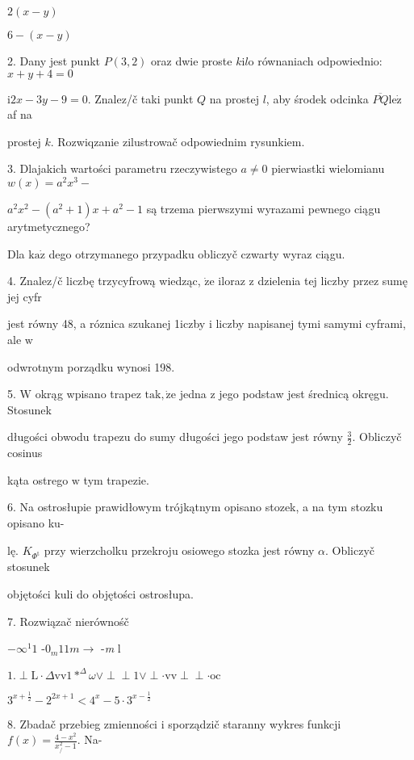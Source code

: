 \documentclass[a4paper,12pt]{article}
\begin{document}
$2(x-y)$

$6-(x-y)$

2. Dany jest punkt $P(3,2)$ oraz dwie proste $k\mathrm{i}l\mathrm{o}$ równaniach odpowiednio: $x+y+4=0$

$\mathrm{i}2x-3y-9=0$. Znalez/č taki punkt $Q$ na prostej $l$, aby środek odcinka $\overline{PQ}\mathrm{l}\mathrm{e}\dot{\mathrm{z}}$ af na

prostej $k$. Rozwiqzanie zilustrowač odpowiednim rysunkiem.

3. Dlajakich wartości parametru rzeczywistego $a\neq 0$ pierwiastki wielomianu $w(x)=a^{2}x^{3}-$

$a^{2}x^{2}-(a^{2}+1)x+a^{2}-1$ są trzema pierwszymi wyrazami pewnego ciągu arytmetycznego?

Dla $\mathrm{k}\mathrm{a}\dot{\mathrm{z}}$ dego otrzymanego przypadku obliczyč czwarty wyraz ciągu.

4. Znalez/č liczbę trzycyfrową wiedząc, $\dot{\mathrm{z}}\mathrm{e}$ iloraz $\mathrm{z}$ dzielenia tej liczby przez sumę jej cyfr

jest równy 48, a róznica szukanej 1iczby $\mathrm{i}$ liczby napisanej tymi samymi cyframi, ale $\mathrm{w}$

odwrotnym porządku wynosi 198.

5. $\mathrm{W}$ okrąg wpisano trapez $\mathrm{t}\mathrm{a}\mathrm{k}, \dot{\mathrm{z}}\mathrm{e}$ jedna $\mathrm{z}$ jego podstaw jest średnicą okręgu. Stosunek

długości obwodu trapezu do sumy długości jego podstaw jest równy $\displaystyle \frac{3}{2}$. Obliczyč cosinus

kąta ostrego $\mathrm{w}$ tym trapezie.

6. Na ostrosłupie prawidłowym trójkątnym opisano stozek, a na tym stozku opisano ku-

lę. $K_{\Phi^{\mathrm{t}}}$ przy wierzcholku przekroju osiowego stozka jest równy $\alpha$. Obliczyč stosunek

objętości kuli do objętości ostrosłupa.

7. Rozwiązač nierównośč

$-\infty^{1}1$ -$0_{m}11 m \rightarrow$ -{\it m} l

$1. \perp \mathrm{L}\cdot\Delta \mathrm{v}\mathrm{v}1*^{\Delta}\omega\vee\perp\perp 1\vee\perp\cdot \mathrm{v}\mathrm{v}\perp\perp\cdot \mathrm{o}\mathrm{c}$

$3^{x+\frac{1}{2}}-2^{2x+1}<4^{x}-5\cdot 3^{x-\frac{1}{2}}$

8. Zbadač przebieg zmienności $\mathrm{i}$ sporządzič staranny wykres funkcji $f(x) = \displaystyle \frac{4-x^{2}}{x_{/}^{2}-1}$. Na-
\end{document}
